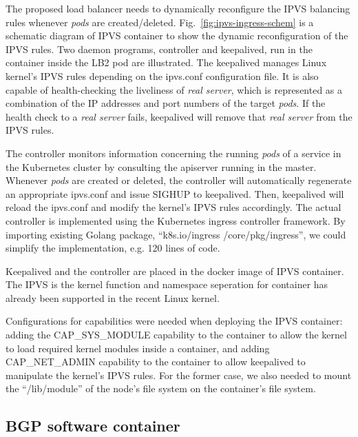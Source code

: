 The proposed load balancer needs to dynamically reconfigure the IPVS balancing rules whenever {\em pods} are created/deleted. 
Fig.~\ref{fig:ipvs-ingress-schem} is a schematic diagram of IPVS container to show the dynamic reconfiguration of the IPVS rules.
Two daemon programs, controller and keepalived, run in the container inside the LB2 pod are illustrated.
The keepalived manages Linux kernel's IPVS rules depending on the ipvs.conf configuration file.
It is also capable of health-checking the liveliness of {\em real server}, 
which is represented as a combination of the IP addresses and port numbers of the target {\em pods}. 
If the health check to a {\em real server} fails, keepalived will remove that {\em real server} from the IPVS rules.

The controller monitors information concerning the running {\em pods} of a service 
in the Kubernetes cluster by consulting the apiserver running in the master.
Whenever {\em pods} are created or deleted, the controller will automatically regenerate an appropriate ipvs.conf 
and issue SIGHUP to keepalived.
Then, keepalived will reload the ipvs.conf and modify the kernel's IPVS rules accordingly.
The actual controller\cite{ktaka_ccmp_2017_826894} is implemented using the Kubernetes ingress controller\cite{K8sIngress2017} framework. 
By importing existing Golang package, \enquote{k8s.io/ingress /core/pkg/ingress}, we could simplify the implementation, e.g. 
120 lines of code.  

Keepalived and the controller are placed in the docker image of IPVS container.
The IPVS is the kernel function and namespace seperation for container has already been supported in the recent Linux kernel. 


Configurations for capabilities were needed when deploying the IPVS container: adding the CAP\_SYS\_MODULE capability 
to the container to allow the kernel to load required kernel modules inside a container, 
and adding CAP\_NET\_ADMIN capability to the container to allow keepalived to manipulate the kernel's IPVS rules. 
For the former case, we also needed to mount the \enquote{/lib/module} of the node's file system on the container's file system.

\subsection{BGP software container}

